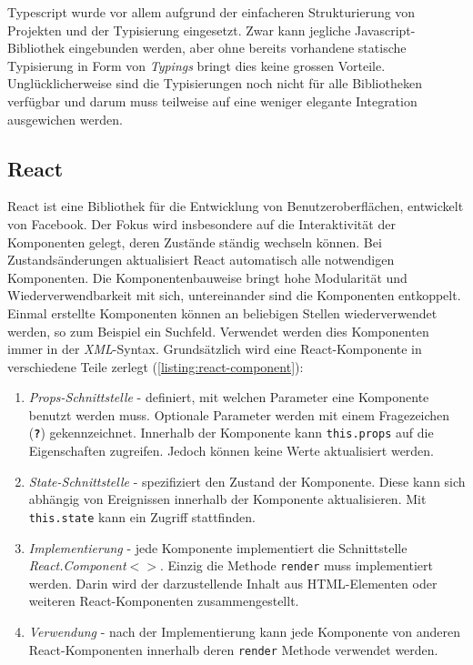 Typescript wurde vor allem aufgrund der ein\-fach\-er\-en Struk\-tu\-rie\-rung von Projekten und der Typisierung eingesetzt. Zwar kann jegliche Ja\-va\-scri\-pt-Bibliothek eingebunden werden, aber ohne bereits vorhandene statische Typisierung in Form von \textit{Typings} bringt dies keine grossen Vorteile. Unglücklicherweise sind die Typisierungen noch nicht für alle Bibliotheken verfügbar und darum muss teilweise auf eine weniger elegante Integration ausgewichen werden.

\subsection{React}\label{react}

React ist eine Bibliothek für die Entwicklung von Benutzeroberflächen, entwickelt von Facebook. Der Fokus wird insbesondere auf die Interaktivität der Komponenten gelegt, deren Zustände ständig wechseln können. Bei Zustandsänderungen aktualisiert React automatisch alle notwendigen Komponenten. Die Komponentenbauweise bringt hohe Modularität und Wiederverwendbarkeit mit sich, untereinander sind die Komponenten entkoppelt. Einmal erstellte Komponenten können an beliebigen Stellen wiederverwendet werden, so zum Beispiel ein Suchfeld. Verwendet werden dies Komponenten immer in der \textit{XML}-Syntax. Grundsätzlich wird eine React-Komponente in verschiedene Teile zerlegt (\autoref{listing:react-component}): 

\begin{enumerate}
    \item \label{props} \textit{Props-Schnittstelle} - definiert, mit welchen Parameter eine Komponente benutzt werden muss. Optionale Parameter werden mit einem Fragezeichen (\texttt{\textbf{?}}) gekennzeichnet. Innerhalb der Komponente kann \texttt{this.props} auf die Eigenschaften zugreifen. Jedoch können keine Werte aktualisiert werden.
    \item \label{states} \textit{State-Schnittstelle} - spezifiziert den Zustand der Komponente. Diese kann sich abhängig von Ereignissen innerhalb der Komponente aktualisieren. Mit \texttt{this.state} kann ein Zugriff stattfinden.
    \item \textit{Implementierung} - jede Komponente implementiert die Schnittstelle \textit{React.Component$<>$}. Einzig die Methode \texttt{render} muss implementiert werden. Darin wird der darzustellende Inhalt aus \gls{HTML}-Elementen oder weiteren React-Komponenten zusammengestellt. 
    \item \textit{Verwendung} - nach der Implementierung kann jede Komponente von anderen React-Komponenten innerhalb deren \texttt{render} Methode verwendet werden.
\end{enumerate}

